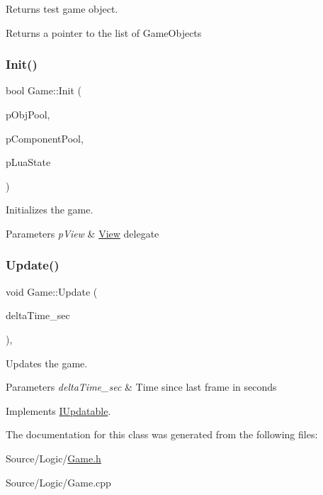 Returns test game object. 

Returns a pointer to the list of Game\+Objects \mbox{\label{class_game_a083fc4d208482811d5dd6efb5c7fbaf4}} 
\subsubsection{\texorpdfstring{Init()}{Init()}}
{\footnotesize\ttfamily bool Game\+::\+Init (\begin{DoxyParamCaption}\item[{\mbox{\hyperlink{class_object_pool}{Object\+Pool}} $\ast$}]{p\+Obj\+Pool,  }\item[{\mbox{\hyperlink{class_component_pool}{Component\+Pool}} $\ast$}]{p\+Component\+Pool,  }\item[{lua\+\_\+\+State $\ast$}]{p\+Lua\+State }\end{DoxyParamCaption})}



Initializes the game. 


\begin{DoxyParams}{Parameters}
{\em p\+View} & \mbox{\hyperlink{class_view}{View}} delegate \\
\hline
\end{DoxyParams}
\mbox{\label{class_game_a49cc5bc8eee98577d72cd49dfc3c4af5}} 
\subsubsection{\texorpdfstring{Update()}{Update()}}
{\footnotesize\ttfamily void Game\+::\+Update (\begin{DoxyParamCaption}\item[{const float}]{delta\+Time\+\_\+sec }\end{DoxyParamCaption})\hspace{0.3cm}{\ttfamily [override]}, {\ttfamily [virtual]}}



Updates the game. 


\begin{DoxyParams}{Parameters}
{\em delta\+Time\+\_\+sec} & Time since last frame in seconds \\
\hline
\end{DoxyParams}


Implements \mbox{\hyperlink{class_i_updatable_a291a40a3422a0b02ef4c10e1d1570eb0}{I\+Updatable}}.



The documentation for this class was generated from the following files\+:\begin{DoxyCompactItemize}
\item 
Source/\+Logic/\mbox{\hyperlink{_game_8h}{Game.\+h}}\item 
Source/\+Logic/Game.\+cpp\end{DoxyCompactItemize}
